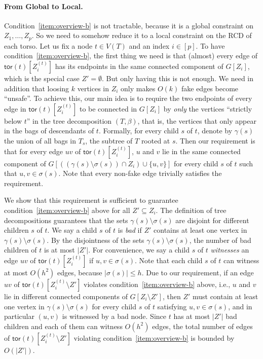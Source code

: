 \documentclass[a4paper,11pt]{article}
\numberwithin{lemma}{section}
\newcommand{\tor}{\mathsf{tor}}
\begin{document}
\paragraph{From Global to Local.}
Condition~\ref{item:overview-b} is not tractable, because it is a global constraint on $Z_1,\dots,Z_p$.
So we need to somehow reduce it to a local constraint on the RCD of each torso.
Let us fix a node $t \in V(T)$ and an index $i \in [p]$.
To have condition~\ref{item:overview-b}, the first thing we need is that (almost) every edge of $\tor(t)[Z_i^{(t)}]$ has its endpoints in the same connected component of $G[Z_i]$, which is the special case $Z' = \emptyset$.
But only having this is not enough.
We need in addition that loosing $k$ vertices in $Z_i$ only makes $O(k)$ fake edges become ``unsafe''.
To achieve this, our main idea is to require the two endpoints of every edge in $\tor(t)[Z_i^{(t)}]$ to be connected in $G[Z_i]$ by \emph{only} the vertices ``strictly below $t$'' in the tree decomposition $(T,\beta)$, that is, the vertices that only appear in the bags of descendants of $t$.
Formally, for every child $s$ of $t$, denote by $\gamma(s)$ the union of all bags in $T_s$, the subtree of $T$ rooted at $s$.
Then our requirement is that for every edge $uv$ of $\tor(t)[Z_i^{(t)}]$, $u$ and $v$ lie in the same connected component of $G[((\gamma(s) \setminus \sigma(s)) \cap Z_i) \cup \{u,v\}]$ for every child $s$ of $t$ such that $u,v \in \sigma(s)$.
Note that every non-fake edge trivially satisfies the requirement.

We show that this requirement is sufficient to guarantee condition~\ref{item:overview-b} above for all $Z' \subseteq Z_i$.
The definition of tree decompositions guarantees that the sets $\gamma(s) \setminus \sigma(s)$ are disjoint for different children $s$ of $t$.
We say a child $s$ of $t$ is \emph{bad} if $Z'$ contains at least one vertex in $\gamma(s) \setminus \sigma(s)$.
By the disjointness of the sets $\gamma(s) \setminus \sigma(s)$, the number of bad children of $t$ is at most $|Z'|$.
For convenience, we say a child $s$ of $t$ \emph{witnesses} an edge $uv$ of $\tor(t)[Z_i^{(t)}]$ if $u,v \in \sigma(s)$.
Note that each child $s$ of $t$ can witness at most $O(h^2)$ edges, because $|\sigma(s)| \leq h$.
Due to our requirement, if an edge $uv$ of $\tor(t)[Z_i^{(t)} \setminus Z']$ violates condition~\ref{item:overview-b} above, i.e., $u$ and $v$ lie in different connected components of $G[Z_i \setminus Z']$, then $Z'$ must contain at least one vertex in $\gamma(s) \setminus \sigma(s)$ for every child $s$ of $t$ satisfying $u,v \in \sigma(s)$, and in particular $(u,v)$ is witnessed by a bad node.
Since $t$ has at most $|Z'|$ bad children and each of them can witness $O(h^2)$ edges, the total number of edges of $\tor(t)[Z_i^{(t)} \setminus Z']$ violating condition~\ref{item:overview-b} is bounded by $O(|Z'|)$.
\end{document}
